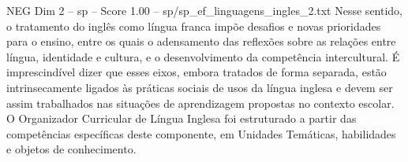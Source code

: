 \begin{textsample}{NEG Dim 2 – sp – Score 1.00 – sp/sp\_ef\_linguagens\_ingles\_2.txt}
Nesse sentido, o tratamento do inglês como língua franca impõe desafios e novas prioridades para o ensino, entre os quais o adensamento das reflexões sobre as relações entre língua, identidade e cultura, e o desenvolvimento da competência intercultural.
É imprescindível dizer que esses eixos, embora tratados de forma separada, estão intrinsecamente ligados às práticas sociais de usos da língua inglesa e devem ser assim trabalhados nas situações de aprendizagem propostas no contexto escolar.
O Organizador Curricular de Língua Inglesa foi estruturado a partir das competências específicas deste componente, em Unidades Temáticas, habilidades e objetos de conhecimento.

\end{textsample}
